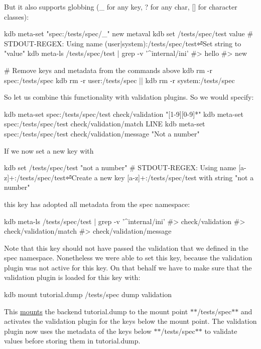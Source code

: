 But it also supports globbing ({\ttfamily \+\_\+} for any key, {\ttfamily ?} for any char, {\ttfamily \mbox{[}\mbox{]}} for character classes)\+:


\begin{DoxyCode}
kdb meta-set "spec:/tests/spec/\_" new metaval
kdb set /tests/spec/test value
# STDOUT-REGEX: Using name (user|system):/tests/spec/test⏎Set string to "value"
kdb meta-ls /tests/spec/test | grep -v '^internal/ini'
#> hello
#> new

# Remove keys and metadata from the commands above
kdb rm -r spec:/tests/spec
kdb rm -r user:/tests/spec || kdb rm -r system:/tests/spec
\end{DoxyCode}


So let us combine this functionality with validation plugins. So we would specify\+:


\begin{DoxyCode}
kdb meta-set spec:/tests/spec/test check/validation "[1-9][0-9]*"
kdb meta-set spec:/tests/spec/test check/validation/match LINE
kdb meta-set spec:/tests/spec/test check/validation/message "Not a number"
\end{DoxyCode}


If we now set a new key with


\begin{DoxyCode}
kdb set /tests/spec/test "not a number"
# STDOUT-REGEX: Using name [a-z]+:/tests/spec/test⏎Create a new key [a-z]+:/tests/spec/test with string
       "not a number"
\end{DoxyCode}


this key has adopted all metadata from the spec namespace\+:


\begin{DoxyCode}
kdb meta-ls /tests/spec/test | grep -v '^internal/ini'
#> check/validation
#> check/validation/match
#> check/validation/message
\end{DoxyCode}


Note that this key should not have passed the validation that we defined in the spec namespace. Nonetheless we were able to set this key, because the validation plugin was not active for this key. On that behalf we have to make sure that the validation plugin is loaded for this key with\+:


\begin{DoxyCode}
kdb mount tutorial.dump /tests/spec dump validation
\end{DoxyCode}


This \hyperlink{doc_tutorials_mount_md}{mounts} the backend {\ttfamily tutorial.\+dump} to the mount point $\ast$$\ast$/tests/spec$\ast$$\ast$ and activates the validation plugin for the keys below the mount point. The validation plugin now uses the metadata of the keys below $\ast$$\ast$/tests/spec$\ast$$\ast$ to validate values before storing them in {\ttfamily tutorial.\+dump}.

